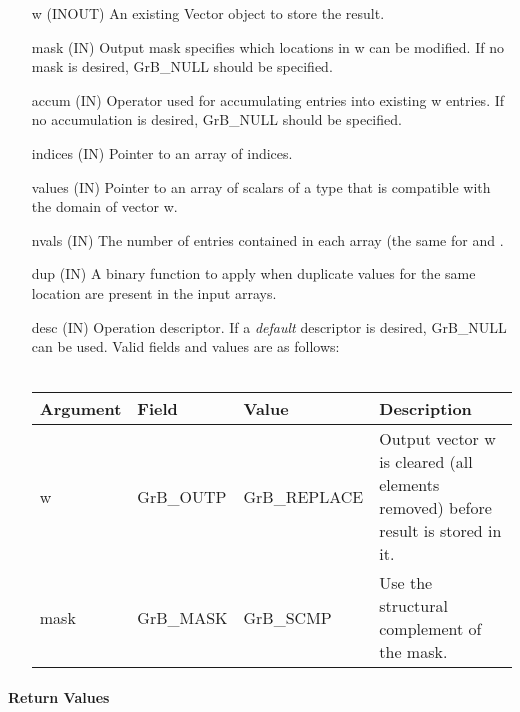 \begin{itemize}[leftmargin=1.1in]
    \item[{\sf w}]       ({\sf INOUT}) An existing Vector object to store the result.
    \item[{\sf mask}]    ({\sf IN}) Output mask specifies which locations in
                         {\sf w} can be modified.  If no mask is desired,
                         {\sf GrB\_NULL} should be specified.
    \item[{\sf accum}]   ({\sf IN}) Operator used for accumulating entries into existing
                         {\sf w} entries. If no accumulation is desired,
                         {\sf GrB\_NULL} should be specified.
    \item[{\sf indices}] ({\sf IN}) Pointer to an array of indices. 
    \item[{\sf values}]  ({\sf IN}) Pointer to an array of scalars of a type that
                                     is compatible with the domain of vector {\sf w}.
    \item[{\sf nvals}]   ({\sf IN}) The number of entries contained in each array (the same for  and .
    \item[{\sf dup}]     ({\sf IN}) A binary function to apply when duplicate values for
                         the same location are present in the input arrays.
    \item[{\sf desc}]    ({\sf IN}) Operation descriptor. If a
    \emph{default} descriptor is desired, {\sf GrB\_NULL} can be
    used.  Valid fields and values are as follows: \\ ~\\
    \begin{tabular}{lllp{2.5in}}
      Argument & Field  & Value & Description \\
      \hline
      {\sf w}    & {\sf GrB\_OUTP} & {\sf GrB\_REPLACE}& Output vector {\sf w} is cleared (all elements removed) before result is stored in it. \\
      {\sf mask} & {\sf GrB\_MASK} & {\sf GrB\_SCMP}   & Use the structural complement of the mask. \\
    \end{tabular}
\end{itemize}

\paragraph{Return Values}

